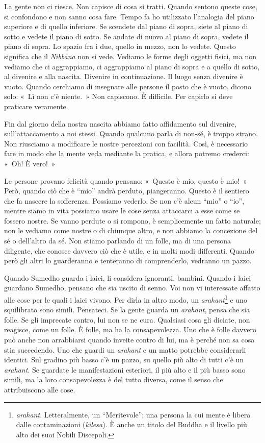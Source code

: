 La gente non ci riesce. Non capisce di cosa si tratti. Quando sentono
queste cose, si confondono e non sanno cosa fare. Tempo fa ho utilizzato
l'analogia del piano superiore e di quello inferiore. Se scendete dal
piano di sopra, siete al piano di sotto e vedete il piano di sotto. Se
andate di nuovo al piano di sopra, vedete il piano di sopra. Lo spazio
fra i due, quello in mezzo, non lo vedete. Questo significa che il
\emph{Nibbāna} non si vede. Vediamo le forme degli oggetti fisici, ma
non vediamo che ci aggrappiamo, ci aggrappiamo al piano di sopra e a
quello di sotto, al divenire e alla nascita. Divenire in continuazione.
Il luogo senza divenire è vuoto. Quando cerchiamo di insegnare alle
persone il posto che è vuoto, dicono solo: «~Lì non c'è niente.~» Non
capiscono. È difficile. Per capirlo si deve praticare veramente.

Fin dal giorno della nostra nascita abbiamo fatto affidamento sul
divenire, sull'attaccamento a noi stessi. Quando qualcuno parla di
non‑sé, è troppo strano. Non riusciamo a modificare le nostre percezioni
con facilità. Così, è necessario fare in modo che la mente veda mediante
la pratica, e allora potremo crederci: «~Oh! È vero!~»

Le persone provano felicità quando pensano: «~Questo è mio, questo è
mio!~» Però, quando ciò che è ``mio'' andrà perduto, piangeranno. Questo
è il sentiero che fa nascere la sofferenza. Possiamo vederlo. Se non c'è
alcun ``mio'' o ``io'', mentre siamo in vita possiamo usare le cose
senza attaccarci a esse come se fossero nostre. Se vanno perdute o si
rompono, è semplicemente un fatto naturale; non le vediamo come nostre o
di chiunque altro, e non abbiamo la concezione del sé o dell'altro da
sé. Non stiamo parlando di un folle, ma di una persona diligente, che
conosce davvero ciò che è utile, e in molti modi differenti. Quando però
gli altri lo guarderanno e tenteranno di comprenderlo, vedranno un
pazzo.

Quando Sumedho guarda i laici, li considera ignoranti, bambini. Quando i
laici guardano Sumedho, pensano che sia uscito di senno. Voi non vi
interessate affatto alle cose per le quali i laici vivono. Per dirla in
altro modo, un \emph{arahant}\footnote{\emph{arahant}. Letteralmente, un
  ``Meritevole''; una persona la cui mente è libera dalle contaminazioni
  (\emph{kilesa}). È anche un titolo del Buddha e il livello più alto
  dei suoi Nobili Discepoli.} e uno squilibrato sono simili. Pensateci.
Se la gente guarda un \emph{arahant}, pensa che sia folle. Se gli
imprecate contro, lui non se ne cura. Qualsiasi cosa gli diciate, non
reagisce, come un folle. È folle, ma ha la consapevolezza. Uno che è
folle davvero può anche non arrabbiarsi quando inveite contro di lui, ma
è perché non sa cosa stia succedendo. Uno che guardi un \emph{arahant} e
un matto potrebbe considerarli identici. Sul gradino più basso c'è un
pazzo, su quello più alto di tutti c'è un \emph{arahant}. Se guardate le
manifestazioni esteriori, il più alto e il più basso sono simili, ma la
loro consapevolezza è del tutto diversa, come il senso che attribuiscono
alle cose.

